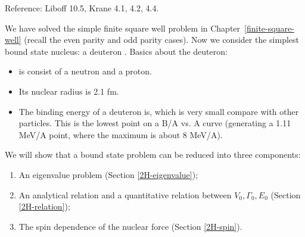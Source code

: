 \documentclass{school-22.101-notes}
\date{October 17, 2011}
\begin{document}
\maketitle


Reference: Liboff 10.5, Krane 4.1, 4.2, 4.4.

We have solved the simple finite square well problem in Chapter~\ref{finite-square-well} (recall the even parity and odd parity cases). Now we consider the simplest bound state nucleus: a deuteron . Basics about the deuteron: 
\begin{itemize}
\item {} is consist of a neutron and a proton. 
\item Its nuclear radius is 2.1 fm. 
\item The binding energy of a deuteron is, 
  which is very small compare with other particles. This is the lowest point on a B/A vs. A curve (generating a 1.11 MeV/A point, where the maximum is about 8 MeV/A). 
\end{itemize}

We will show that a bound state problem can be reduced into three components:
\begin{enumerate}
\item An eigenvalue problem (Section \ref{2H-eigenvalue});
\item An analytical relation and a quantitative relation between $V_0, \Gamma_0, E_0$ (Section \ref{2H-relation});
\item The spin dependence of the nuclear force (Section \ref{2H-spin}).
\end{enumerate}
\end{document}
